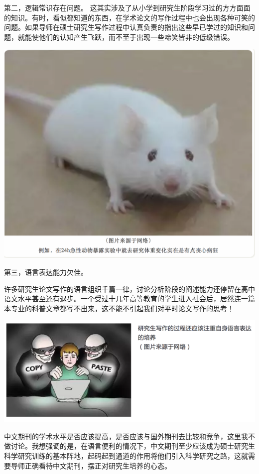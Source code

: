 \documentclass[
]{book}
\begin{document}
第二，逻辑常识存在问题。
这其实涉及了从小学到研究生阶段学习过的方方面面的知识。有时，看似都知道的东西，在学术论文的写作过程中也会出现各种可笑的问题。如果导师在硕士研究生写作过程中认真负责的指出这些早已学过的知识和问题，就能使他们的认知产生飞跃，而不至于出现一些啼笑皆非的低级错误。

\includegraphics[width=8.33in]{images/edit4}

第三，语言表达能力欠佳。

许多研究生论文写作的语言组织千篇一律，讨论分析阶段的阐述能力还停留在高中语文水平甚至还有退步。一个受过十几年高等教育的学生进入社会后，居然连一篇本专业的科普文章都写不出来，这不能不引起我们对平时论文写作的思考！

\includegraphics[width=8.33in]{images/edit5}

中文期刊的学术水平是否应该提高，是否应该与国外期刊去比较和竞争，这里我不做讨论。我想强调的是，在语言便利的情况下，中文期刊至少应该成为硕士研究生科学研究训练的基本阵地，起码起到通道的作用将他们引入科学研究之路，这就需要导师正确看待中文期刊，摆正对研究生培养的心态。
\end{document}

